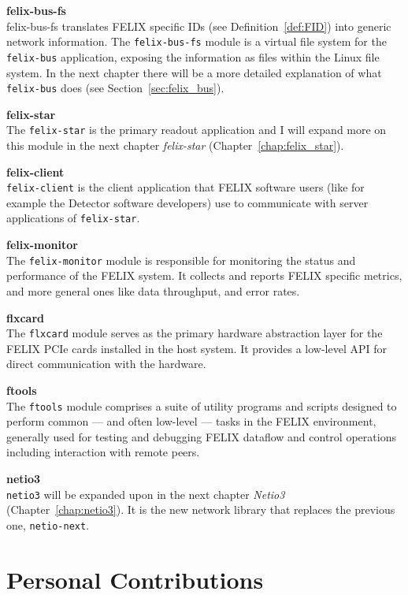 \textbf{felix-bus-fs}\\
felix-bus-fs translates \acs{FELIX} specific IDs (see Definition~\ref{def:FID}) into generic network information.
The \texttt{felix-bus-fs} module is a virtual file system for the \texttt{felix-bus} application, exposing the information as files within the Linux file system. In the next chapter there will be a more detailed explanation of what \texttt{felix-bus} does (see Section~\ref{sec:felix_bus}).

\textbf{felix-star}\\
The \texttt{felix-star} is the primary readout application and I will expand more on this module in the next chapter \emph{felix-star} (Chapter~\ref{chap:felix_star}).

\textbf{felix-client}\\
\texttt{felix-client} is the client application that \acs{FELIX} software users (like for example the Detector software developers) use to communicate with server applications of \texttt{felix-star}.

\textbf{felix-monitor}\\
The \texttt{felix-monitor} module is responsible for monitoring the status and performance of the \acs{FELIX} system. It collects and reports \acs{FELIX} specific metrics, and more general ones like data throughput, and error rates.

\textbf{flxcard}\\
The \texttt{flxcard} module serves as the primary hardware abstraction layer for the \acs{FELIX} \acs{PCIe} cards installed in the host system. It provides a low-level \acs{API} for direct communication with the hardware.

\textbf{ftools}\\
The \texttt{ftools} module comprises a suite of utility programs and scripts designed to perform common --- and often low-level --- tasks in the \acs{FELIX} environment, generally used for testing and debugging \acs{FELIX} dataflow and control operations including interaction with remote peers.

\textbf{netio3}\\
\texttt{netio3} will be expanded upon in the next chapter \emph{Netio3} (Chapter~\ref{chap:netio3}). It is the new network library that replaces the previous one, \texttt{netio-next}.

\clearpage
\section{ Personal Contributions}

